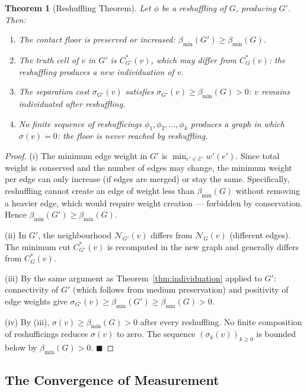\documentclass[12pt, a4paper]{article}
\theoremstyle{plain}
\newtheorem{theorem}{Theorem}[section]
\theoremstyle{definition}
\theoremstyle{remark}
\newcommand{\Nbd}{\mathcal{N}}
\newcommand{\Ecal}{\mathcal{E}}
\newcommand{\bmin}{\beta_{\min}}
\newcommand{\qed}{\hfill$\blacksquare$}
\begin{document}
\begin{theorem}[Reshuffling Theorem]
\label{thm:reshuffling}
Let $\phi$ be a reshuffling of $G$, producing $G'$. Then:
\begin{enumerate}[label=(\roman*)]
  \item The contact floor is preserved or increased: $\bmin(G') \geq \bmin(G)$.
  \item The truth cell of $v$ in $G'$ is $C^*_{G'}(v)$, which may differ from
  $C^*_G(v)$: the reshuffling produces a new individuation of $v$.
  \item The separation cost $\sigma_{G'}(v)$ satisfies $\sigma_{G'}(v) \geq
  \bmin(G) > 0$: $v$ remains individuated after reshuffling.
  \item No finite sequence of reshufficings $\phi_1, \phi_2, \ldots, \phi_k$
  produces a graph in which $\sigma(v) = 0$: the floor is never reached by
  reshuffling.
\end{enumerate}
\end{theorem}

\begin{proof}
(i) The minimum edge weight in $G'$ is $\min_{e' \in \Ecal'} w'(e')$. Since
total weight is conserved and the number of edges may change, the minimum
weight per edge can only increase (if edges are merged) or stay the same.
Specifically, reshuffling cannot create an edge of weight less than
$\bmin(G)$ without removing a heavier edge, which would require weight
creation --- forbidden by conservation. Hence $\bmin(G') \geq \bmin(G)$.

(ii) In $G'$, the neighbourhood $\Nbd_{G'}(v)$ differs from $\Nbd_G(v)$
(different edges). The minimum cut $C^*_{G'}(v)$ is recomputed in the new
graph and generally differs from $C^*_G(v)$.

(iii) By the same argument as Theorem~\ref{thm:individuation} applied to
$G'$: connectivity of $G'$ (which follows from medium preservation) and
positivity of edge weights give $\sigma_{G'}(v) \geq \bmin(G') \geq
\bmin(G) > 0$.

(iv) By (iii), $\sigma(v) \geq \bmin(G) > 0$ after every reshuffling. No
finite composition of reshufficings reduces $\sigma(v)$ to zero. The sequence
$(\sigma_k(v))_{k \geq 0}$ is bounded below by $\bmin(G) > 0$. \qed
\end{proof}

\subsection{The Convergence of Measurement}
\end{document}
